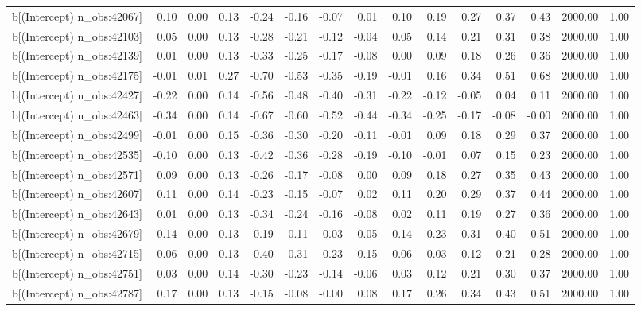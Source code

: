 \begin{table}[ht]
\begin{tabular}{rrrrrrrrrrrrrrr}
  b[(Intercept) n\_obs:42067] & 0.10 & 0.00 & 0.13 & -0.24 & -0.16 & -0.07 & 0.01 & 0.10 & 0.19 & 0.27 & 0.37 & 0.43 & 2000.00 & 1.00 \\ 
  b[(Intercept) n\_obs:42103] & 0.05 & 0.00 & 0.13 & -0.28 & -0.21 & -0.12 & -0.04 & 0.05 & 0.14 & 0.21 & 0.31 & 0.38 & 2000.00 & 1.00 \\ 
  b[(Intercept) n\_obs:42139] & 0.01 & 0.00 & 0.13 & -0.33 & -0.25 & -0.17 & -0.08 & 0.00 & 0.09 & 0.18 & 0.26 & 0.36 & 2000.00 & 1.00 \\ 
  b[(Intercept) n\_obs:42175] & -0.01 & 0.01 & 0.27 & -0.70 & -0.53 & -0.35 & -0.19 & -0.01 & 0.16 & 0.34 & 0.51 & 0.68 & 2000.00 & 1.00 \\ 
  b[(Intercept) n\_obs:42427] & -0.22 & 0.00 & 0.14 & -0.56 & -0.48 & -0.40 & -0.31 & -0.22 & -0.12 & -0.05 & 0.04 & 0.11 & 2000.00 & 1.00 \\ 
  b[(Intercept) n\_obs:42463] & -0.34 & 0.00 & 0.14 & -0.67 & -0.60 & -0.52 & -0.44 & -0.34 & -0.25 & -0.17 & -0.08 & -0.00 & 2000.00 & 1.00 \\ 
  b[(Intercept) n\_obs:42499] & -0.01 & 0.00 & 0.15 & -0.36 & -0.30 & -0.20 & -0.11 & -0.01 & 0.09 & 0.18 & 0.29 & 0.37 & 2000.00 & 1.00 \\ 
  b[(Intercept) n\_obs:42535] & -0.10 & 0.00 & 0.13 & -0.42 & -0.36 & -0.28 & -0.19 & -0.10 & -0.01 & 0.07 & 0.15 & 0.23 & 2000.00 & 1.00 \\ 
  b[(Intercept) n\_obs:42571] & 0.09 & 0.00 & 0.13 & -0.26 & -0.17 & -0.08 & 0.00 & 0.09 & 0.18 & 0.27 & 0.35 & 0.43 & 2000.00 & 1.00 \\ 
  b[(Intercept) n\_obs:42607] & 0.11 & 0.00 & 0.14 & -0.23 & -0.15 & -0.07 & 0.02 & 0.11 & 0.20 & 0.29 & 0.37 & 0.44 & 2000.00 & 1.00 \\ 
  b[(Intercept) n\_obs:42643] & 0.01 & 0.00 & 0.13 & -0.34 & -0.24 & -0.16 & -0.08 & 0.02 & 0.11 & 0.19 & 0.27 & 0.36 & 2000.00 & 1.00 \\ 
  b[(Intercept) n\_obs:42679] & 0.14 & 0.00 & 0.13 & -0.19 & -0.11 & -0.03 & 0.05 & 0.14 & 0.23 & 0.31 & 0.40 & 0.51 & 2000.00 & 1.00 \\ 
  b[(Intercept) n\_obs:42715] & -0.06 & 0.00 & 0.13 & -0.40 & -0.31 & -0.23 & -0.15 & -0.06 & 0.03 & 0.12 & 0.21 & 0.28 & 2000.00 & 1.00 \\ 
  b[(Intercept) n\_obs:42751] & 0.03 & 0.00 & 0.14 & -0.30 & -0.23 & -0.14 & -0.06 & 0.03 & 0.12 & 0.21 & 0.30 & 0.37 & 2000.00 & 1.00 \\ 
  b[(Intercept) n\_obs:42787] & 0.17 & 0.00 & 0.13 & -0.15 & -0.08 & -0.00 & 0.08 & 0.17 & 0.26 & 0.34 & 0.43 & 0.51 & 2000.00 & 1.00 \\ 

\end{tabular}
\end{table}

